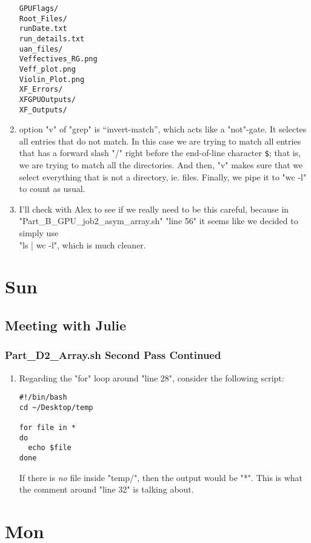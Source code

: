 \documentclass[12pt,letterpaper]{article}
\begin{document}
\begin{enumerate}
\begin{verbatim}
GPUFlags/
Root_Files/
runDate.txt
run_details.txt
uan_files/
Veffectives_RG.png
Veff_plot.png
Violin_Plot.png
XF_Errors/
XFGPUOutputs/
XF_Outputs/
    \end{verbatim}
  \item option "v" of "grep" is ``invert-match'', which acts like a "not"-gate. It 
    selectes all entries that do not match. In this case we are trying to match
    all entries that has a forward slash "/" right before the end-of-line
    character \verb|$|; that is, we are trying to match all the directories.
    And then, "v" makes sure that we select everything that is not a directory,
    ie. files. Finally, we pipe it to "wc -l" to count as usual.
  \item I'll check with Alex to see if we really need to be this careful, because in \\
    "Part_B_GPU_job2_asym_array.sh" "line 56" it seems like we decided to simply use \\
    "ls | wc -l", which is much cleaner.
\end{enumerate}

\section{Sun}
\subsection{Meeting with Julie}
\subsubsection{Part\_D2\_Array.sh Second Pass Continued}
\begin{enumerate}
  \item Regarding the "for" loop around "line 28", consider the following script:
    \begin{verbatim}
#!/bin/bash
cd ~/Desktop/temp

for file in *
do 
  echo $file
done
    \end{verbatim}
    If there is \textit{no} file inside "temp/", then the output would be "*". This is
    what the comment around "line 32" is talking about.
\end{enumerate}

\section{Mon}
\end{document}
